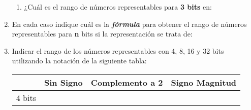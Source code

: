 \documentclass[12pt]{article}
\begin{document}
\begin{enumerate}
\begin{enumerate}
            \item ¿Cuál es el rango de números representables para \textbf{3
                bits} en:


    \end{enumerate}

    \item En cada caso indique cuál es la \textbf{\emph{fórmula}} 
    para obtener el rango de números
    representables para \textbf{n} bits si la representación se trata de:


    \item Indicar el rango de los números representables con 4, 8, 16 y 32
        bits utilizando la notación de la siguiente tabla:

        \begin{center}

            \begin{tabular}[t]{|c|c|c|c|}

            \cline{2-4}

            \multicolumn{1}{c|}{}& \textbf{Sin Signo} &
                \textbf{Complemento a 2} & \textbf{Signo Magnitud}\\

            \hline

                4 bits & \hspace{9em}~ &\hspace{9em}~&\hspace{9em}~\\


\end{tabular}
\end{center}
\end{enumerate}
\end{document}
